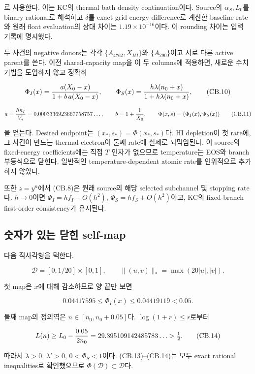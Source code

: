 로 사용한다. 이는 KC의 thermal bath density continuation이다. Source의 \(\alpha_S,L_0\)를 binary rational로 해석하고 \(\delta\)를 exact grid energy difference로 계산한 baseline rate와 원래 float evaluation의 상대 차이는 \(1.19\times10^{-16}\)이다. 이 rounding 차이는 입력 기록에 명시했다.

두 사건의 negative donors는 각각 \(\{A_{4762},X_{HI}\}\)와 \(\{A_{290}\}\)이고 서로 다른 active parent를 쓴다. 이전 shared-capacity map을 이 두 columns에 적용하면, 새로운 수치기법을 도입하지 않고 정확히

\[
 \Phi_I(x)={a(X_0-x)\over1+b\,a(X_0-x)},\qquad
 \Phi_S(x)={h\lambda(n_0+x)\over1+h\lambda(n_0+x)},
 \tag{CB.10}
\]

\[
 a={h\kappa_I\over V_*}=0.0003336923667758757\ldots,
 \qquad b=1+{1\over X_0},\qquad
 \Phi(x,s)=(\Phi_I(x),\Phi_S(x))
 \tag{CB.11}
\]

을 얻는다. Desired endpoint는 \((x_*,s_*)=\Phi(x_*,s_*)\)다. HI depletion이 첫 rate에, 그 사건이 만드는 thermal electron이 둘째 rate에 실제로 되먹임된다. 이 source의 fixed-energy coefficients에는 직접 \(T\) 인자가 없으므로 temperature는 EOS와 branch 부등식으로 닫힌다. 일반적인 temperature-dependent atomic rate를 인위적으로 추가하지 않았다.

또한 \(z=y^n\)에서 (CB.8)은 원래 source의 해당 selected subchannel 및 stopping rate다. \(h\to0\)이면 \(\Phi_I=h f_I+O(h^2)\), \(\Phi_S=h f_S+O(h^2)\)이고, KC의 fixed-branch first-order consistency가 유지된다.

\hypertarget{uxc22buxc790uxac00-uxc788uxb294-uxb2ebuxd78c-self-map}{%
\subsection{숫자가 있는 닫힌 self-map}\label{uxc22buxc790uxac00-uxc788uxb294-uxb2ebuxd78c-self-map}}

다음 직사각형을 택한다.

\[
 \mathcal D=[0,1/20]\times[0,1],\qquad
 \|(u,v)\|_* =\max(20|u|,|v|).
 \tag{CB.12}
\]

첫 map은 \(x\)에 대해 감소하므로 양 끝만 보면

\[
 0.04417595
 \le\Phi_I(x)\le
 0.04419119
 <0.05.
 \tag{CB.13}
\]

둘째 map의 정의역은 \(n\in[n_0,n_0+0.05]\)다. \(\log(1+r)\le r\)로부터

\[
 L(n)\ge L_0-{0.05\over2n_0}
       =29.395109142485783\ldots>\tfrac12.
 \tag{CB.14}
\]

따라서 \(\lambda>0\), \(\lambda'>0\), \(0<\Phi_S<1\)이다. (CB.13)--(CB.14)는 모두 exact rational inequalities로 확인했으므로 \(\Phi(\mathcal D)\subset\mathcal D\)다.

